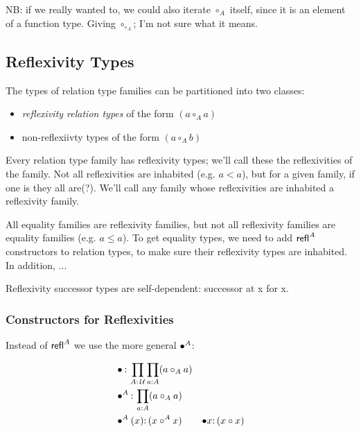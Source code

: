 \documentclass{article}
\begin{document}
NB: if we really wanted to, we could also iterate \(\circ_A\) itself,
since it is an element of a function type.  Giving
\(\circ_{\circ_A}\); I'm not sure what it means.




\subsection{Reflexivity Types}

The types of relation type families can be partitioned into two classes:

\begin{itemize}
\item \textit{reflexivity relation types} of the form \((a\circ_A a)\)
\item non-reflexiivty types of the form \((a\circ_A b)\)
\end{itemize}

\begin{remark}
Every relation type family has reflexivity types; we'll call these the
reflexivities of the family.  Not all reflexivities are inhabited
(e.g. \(a < a\)), but for a given family, if one is they all are(?).
We'll call any family whose reflexivities are inhabited a reflexivity
family.

All equality families are reflexivity families, but not all
reflexivity families are equality families (e.g. \(a \leq a\)).  To
get equality types, we need to add \(\textsf{refl}^A\) constructors to
relation types, to make sure their reflexivity types are inhabited.
In addition, ...
\end{remark}

Reflexivity successor types are self-dependent: successor at x for x.

\subsubsection{Constructors for Reflexivities}

Instead of \(\textsf{refl}^A\) we use the more general \(\bullet^A\):

\begin{align}
  &\bullet{:}\,\prod\limits_{A{:}\,\mathcal{U}}\prod\limits_{a{:}A}(a\circ_Aa) \\
  &\bullet^A{:}\, \prod\limits_{a:A}(a\circ_Aa) \\
  &\bullet^A(x){:}\, (x\circ^A x) & \bullet x{:}\,(x\circ x)
\end{align}
\end{document}
